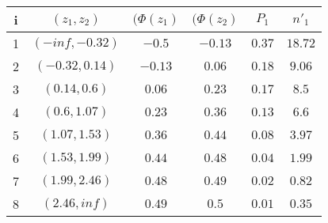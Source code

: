 \begin{tabular}{|c|c|c|c|c|c|}
    \hline
    i & $(z_1, z_2)$ & $(\Phi(z_1)$ & $(\Phi(z_2)$ & $P_1$ & $n'_1$\\
    \hline
    1 & $(-inf, -0.32)$ & $-0.5$ & $-0.13$ & $0.37$ & $18.72$\\
    \hline
    2 & $(-0.32, 0.14)$ & $-0.13$ & $0.06$ & $0.18$ & $9.06$\\
    \hline
    3 & $(0.14, 0.6)$ & $0.06$ & $0.23$ & $0.17$ & $8.5$\\
    \hline
    4 & $(0.6, 1.07)$ & $0.23$ & $0.36$ & $0.13$ & $6.6$\\
    \hline
    5 & $(1.07, 1.53)$ & $0.36$ & $0.44$ & $0.08$ & $3.97$\\
    \hline
    6 & $(1.53, 1.99)$ & $0.44$ & $0.48$ & $0.04$ & $1.99$\\
    \hline
    7 & $(1.99, 2.46)$ & $0.48$ & $0.49$ & $0.02$ & $0.82$\\
    \hline
    8 & $(2.46, inf)$ & $0.49$ & $0.5$ & $0.01$ & $0.35$\\
    \hline
\end{tabular}